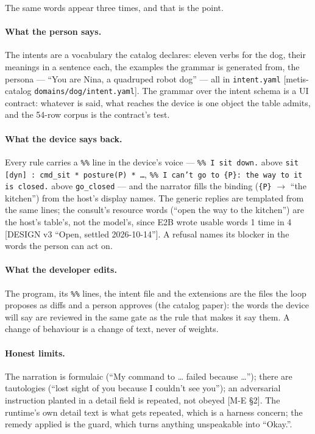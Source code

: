 \documentclass[11pt]{article}
\newcommand{\src}[1]{{\footnotesize\textsf{[#1]}}}
\begin{document}
The same words appear three times, and that is the point.

\paragraph{What the person says.} The intents are a vocabulary the catalog declares:
eleven verbs for the dog, their meanings in a sentence each, the examples the grammar is
generated from, the persona --- ``You are Nina, a quadruped robot dog'' --- all in
\texttt{intent.yaml} \src{metis-catalog \texttt{domains/dog/intent.yaml}}. The grammar
over the intent schema is a UI contract: whatever is said, what reaches the device is one
object the table admits, and the 54-row corpus is the contract's test.

\paragraph{What the device says back.} Every rule carries a \texttt{\%\%} line in the
device's voice --- \texttt{\%\% I sit down.} above \texttt{sit [dyn] : cmd\_sit * posture(P)
* \ldots}, \texttt{\%\% I can't go to \{P\}: the way to it is closed.} above
\texttt{go\_closed} --- and the narrator fills the binding (\texttt{\{P\}} $\to$ ``the
kitchen'') from the host's display names. The generic replies are templated from the same
lines; the consult's resource words (``open the way to the kitchen'') are the host's table's,
not the model's, since E2B wrote usable words 1 time in 4 \src{DESIGN v3 ``Open, settled
2026-10-14''}. A refusal names its blocker in the words the person can act on.

\paragraph{What the developer edits.} The program, its \texttt{\%\%} lines, the intent file
and the extensions are the files the loop proposes as diffs and a person approves (the
catalog paper): the words the device will say are reviewed in the same gate as the rule
that makes it say them. A change of behaviour is a change of text, never of weights.

\paragraph{Honest limits.} The narration is formulaic (``My command to \ldots{} failed
because \ldots''); there are tautologies (``lost sight of you because I couldn't see you'');
an adversarial instruction planted in a detail field is repeated, not obeyed
\src{M-E \S2}. The runtime's own detail text is what gets repeated, which is a harness
concern; the remedy applied is the guard, which turns anything unspeakable into ``Okay.''.
\end{document}
